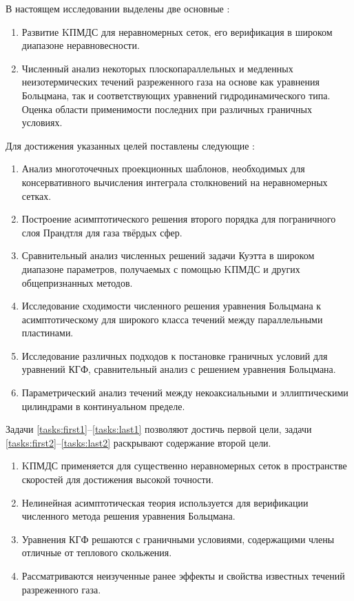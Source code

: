 В настоящем исследовании выделены две основные {\aim}:
\begin{enumerate}
    \item Развитие KПМДС для неравномерных сеток, его верификация в широком диапазоне неравновесности.
    \item Численный анализ некоторых плоскопараллельных и медленных неизотермических течений разреженного газа
    на основе как уравнения Больцмана, так и соответствующих уравнений гидродинамического типа.
    Оценка области применимости последних при различных граничных условиях.
\end{enumerate}
Для достижения указанных целей поставлены следующие {\tasks}:
\begin{enumerate}
    \item Анализ многоточечных проекционных шаблонов, необходимых для консервативного вычисления
    интеграла столкновений на неравномерных сетках.\label{tasks:first1}
    \item Построение асимптотического решения второго порядка
    для пограничного слоя Прандтля для газа твёрдых сфер. \label{tasks:first2}
    \item Сравнительный анализ численных решений задачи Куэтта в широком диапазоне параметров,
    получаемых с помощью KПМДС и других общепризнанных методов.
    \item Исследование сходимости численного решения уравнения Больцмана к асимптотическому
    для широкого класса течений между параллельными пластинами.
    \item Исследование различных подходов к постановке граничных условий для уравнений КГФ,
    сравнительный анализ с решением уравнения Больцмана.\label{tasks:last1}
    \item Параметрический анализ течений между некоаксиальными и эллиптическими цилиндрами
    в континуальном пределе.\label{tasks:last2}
\end{enumerate}
Задачи \ref{tasks:first1}--\ref{tasks:last1} позволяют достичь первой цели,
задачи \ref{tasks:first2}--\ref{tasks:last2} раскрывают содержание второй цели.

{\novelty}
\begin{enumerate}
    \item KПМДС применяется для существенно неравномерных сеток в пространстве скоростей для достижения высокой точности. %
    \item Нелинейная асимптотическая теория используется для верификации численного метода решения уравнения Больцмана. %
    \item Уравнения КГФ решаются с граничными условиями, содержащими члены отличные от теплового скольжения. %
    \item Рассматриваются неизученные ранее эффекты и свойства известных течений разреженного газа. %
\end{enumerate}

